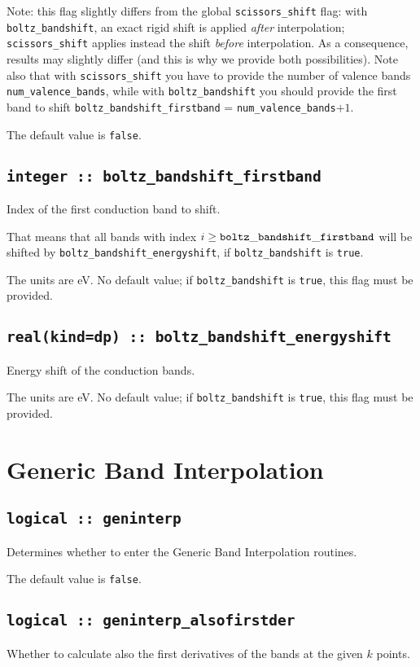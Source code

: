 Note: this flag slightly differs from the global {\tt scissors\_shift} flag: with {\tt boltz\_bandshift}, an exact rigid shift is applied \emph{after} interpolation; {\tt scissors\_shift} applies instead the shift \emph{before} interpolation. As a consequence, results may slightly differ (and this is why we provide both possibilities). Note also that with {\tt scissors\_shift} you have to provide the number of valence bands {\tt num\_valence\_bands}, while with {\tt boltz\_bandshift} you should provide the first band to shift {\tt boltz\_bandshift\_firstband} = {\tt num\_valence\_bands}$+1$.

The default value is \verb#false#.

\subsection[boltz\_bandshift\_firstband]{\tt integer :: boltz\_bandshift\_firstband}
Index of the first conduction band to shift.

That means that all bands with index $i\ge {\tt boltz\_bandshift\_firstband}$ will be shifted by  {\tt boltz\_bandshift\_energyshift}, if {\tt boltz\_bandshift} is \verb#true#.

The units are eV.
No default value; if {\tt boltz\_bandshift} is \verb#true#, this flag must be provided.

\subsection[boltz\_bandshift\_energyshift]{\tt real(kind=dp) :: boltz\_bandshift\_energyshift}
Energy shift of the conduction bands.

The units are eV.
No default value; if {\tt boltz\_bandshift} is \verb#true#, this flag must be provided.


\section{Generic Band Interpolation}
\subsection[boltzwann]{\tt logical :: geninterp}
Determines whether to enter the Generic Band Interpolation routines.

The default value is \verb#false#.

\subsection[geninterp\_alsofirstder]{\tt logical :: geninterp\_alsofirstder}
Whether to calculate also the first derivatives of the bands at the
given $k$ points.

